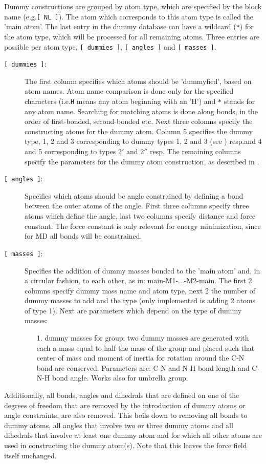 Dummy constructions are grouped by atom type, which are specified by
the block name (e.g.\@ \verb'[ NL ]'). The atom which corresponds to
this atom type is called the 'main atom'. The last entry in the dummy
database can have a wildcard (\verb'*') for the atom type, which will
be processed for all remaining atoms. Three entries are possible per
atom type, \verb'[ dummies ]', \verb'[ angles ]' and \verb'[ masses ]'.
\begin{description}
\item[\mbox{\tt[ dummies ]}:]
The first column specifies which atoms should be 'dummyfied', based on
atom names. Atom name comparison is done only for the specified
characters (i.e.\@ \verb'H' means any atom beginning with an 'H') and
\verb'*' stands for any atom name. Searching for matching atoms is
done along bonds, in the order of first-bonded, second-bonded
etc. Next three colomns specify the constructing atoms for the dummy
atom. Column 5 specifies the dummy type, 1, 2 and 3 corresponding to
dummy types 1, 2 and 3 (see ) resp.\@ and 4 and 5
corresponding to types 2$'$ and 2$''$ resp. The remaining columns
specify the parameters for the dummy atom construction, as described
in .
\item[\mbox{\tt[ angles ]}:]
Specifies which atoms should be angle constrained by defining a bond
between the outer atoms of the angle. First three columns specify
three atoms which define the angle, last two columns specify distance
and force constant. The force constant is only relevant for energy
minimization, since for MD all bonds will be constrained.
\item[\mbox{\tt[ masses ]}:]
Specifies the addition of dummy masses bonded to the 'main atom' and,
in a circular fashion, to each other, as in: main-M1-...-M2-main. The
first 2 columns specify dummy mass name and atom type, next 2 the
number of dummy masses to add and the type (only implemented is adding
2 atoms of type 1). Next are parameters which depend on the type of dummy
masses:
\begin{itemize}
\item[1.] dummy masses for {\aminep} group: two dummy masses are generated
with each a mass equal to half the mass of the {\aminep} group and placed
such that center of mass and moment of inertia for rotation around the
C-N bond are conserved. Parameters are: C-N and N-H bond length and
C-N-H bond angle. Works also for umbrella {\amine} group.
\end{itemize}
\end{description}
Additionally, all bonds, angles and dihedrals that are defined on one
of the degrees of freedom that are removed by the introduction of
dummy atoms or angle constraints, are also removed. This boils down to
removing all bonds to dummy atoms, all angles that involve two or
three dummy atoms and all dihedrals that involve at least one dummy
atom and for which all other atoms are used in constructing the dummy
atom(s). Note that this leaves the force field itself unchanged.

